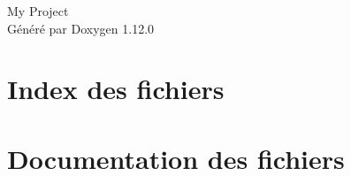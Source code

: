 \documentclass[twoside]{book}
\newcommand{\+}{\discretionary{\mbox{\scriptsize$\hookleftarrow$}}{}{}}
\newcommand{\clearemptydoublepage}{%
    \newpage{\pagestyle{empty}\cleardoublepage}%
  }
\begin{document}
  \raggedbottom
    \hypersetup{pageanchor=false,
                bookmarksnumbered=true,
                pdfencoding=unicode
               }
  \begin{titlepage}
  \vspace*{7cm}
  \begin{center}%
  {\Large My Project}\\
  \vspace*{1cm}
  {\large Généré par Doxygen 1.12.0}\\
  \end{center}
  \end{titlepage}
  \clearemptydoublepage
  \tableofcontents
  \clearemptydoublepage
  \hypersetup{pageanchor=true}
\chapter{Index des fichiers}

\chapter{Documentation des fichiers}



















\end{document}
